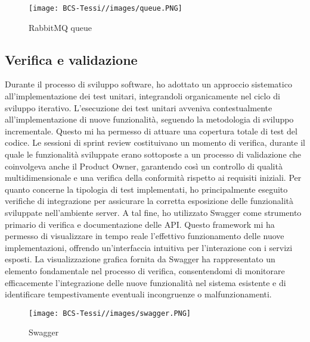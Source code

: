 \begin{figure}[H]
    \centering
    \texttt{[image: BCS-Tessi//images/queue.PNG]}
    \caption{RabbitMQ queue}
    \label{fig:queue}
\end{figure}

        
        \subsection{Verifica e validazione}
        Durante il processo di sviluppo software, ho adottato un approccio sistematico all'implementazione dei test unitari, integrandoli organicamente nel ciclo di sviluppo iterativo. L'esecuzione dei test unitari avveniva contestualmente all'implementazione di nuove funzionalità, seguendo la metodologia di sviluppo incrementale. Questo mi ha permesso di attuare una copertura totale di test del codice.
Le sessioni di sprint review costituivano un momento di verifica, durante il quale le funzionalità sviluppate erano sottoposte a un processo di validazione che coinvolgeva anche il Product Owner, garantendo così un controllo di qualità multidimensionale e una verifica della conformità rispetto ai requisiti iniziali.
Per quanto concerne la tipologia di test implementati, ho principalmente eseguito verifiche di integrazione per assicurare la corretta esposizione delle funzionalità sviluppate nell'ambiente server. A tal fine, ho utilizzato Swagger come strumento primario di verifica e documentazione delle API. Questo framework mi ha permesso di visualizzare in tempo reale l'effettivo funzionamento delle nuove implementazioni, offrendo un'interfaccia intuitiva per l'interazione con i servizi esposti.
La visualizzazione grafica fornita da Swagger ha rappresentato un elemento fondamentale nel processo di verifica, consentendomi di monitorare efficacemente l'integrazione delle nuove funzionalità nel sistema esistente e di identificare tempestivamente eventuali incongruenze o malfunzionamenti. 
\begin{figure}[H]
    \centering
    \texttt{[image: BCS-Tessi//images/swagger.PNG]}
    \caption{Swagger}
    \label{fig:swagger}
\end{figure}

